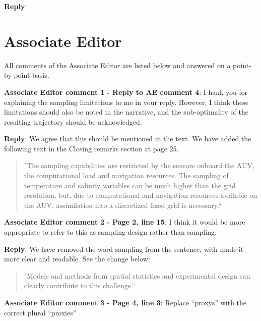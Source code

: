 \documentclass[a4paper]{article}
\newcounter{reviewer}
\def\aecom{\textbf{Associate Editor comment }}
\def\reply{\textbf{Reply}}
\begin{document}
\vspace{5mm}
\reply: 

 \section*{Associate Editor}
All comments of the Associate Editor are listed below and answered on a point-by-point basis.

\setcounter{reviewer}{1}

\vspace{5mm}
\noindent \aecom \textbf{1 - Reply to AE comment 4}: 
I hank you for explaining the sampling limitations to me in your reply.  However, I think these limitations should also be noted in the narrative, and the sub-optimality of the resulting trajectory should be acknowledged.

\vspace{5mm}
\reply: We agree that this should be mentioned in the text. We have added the following text in the Closing remarks section at page 25.

\begin{quote}
    "The sampling capabilities are restricted by the sensors onboard the AUV, the computational load and navigation resources. The sampling of temperature and salinity variables can be much higher than the grid resolution, but, due to computational and navigation resources available on the AUV, assimilation into a discretized fixed grid is necessary.``
\end{quote}

\vspace{5mm}
\noindent \aecom \textbf{2 - Page 2, line 15}:  I think it would be more appropriate to refer to this as sampling design rather than sampling.

\vspace{5mm}
\reply: We have removed the word sampling from the sentence, with made it more clear and readable. See the change below:

\begin{quote}
    "Models and methods from spatial statistics and experimental design can clearly contribute to this challenge.``
\end{quote}

\vspace{5mm}
\noindent \aecom \textbf{3 - Page 4, line 3}:  Replace “proxys” with the correct plural “proxies”
\end{document}
